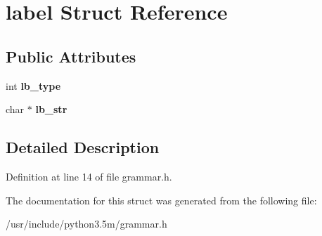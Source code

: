 \hypertarget{structlabel}{}\section{label Struct Reference}
\label{structlabel}
\subsection*{Public Attributes}
\begin{DoxyCompactItemize}
\item 
int {\bfseries lb\+\_\+type}\hypertarget{structlabel_a63a37c929ae2356ee04dbca24c7b9150}{}\label{structlabel_a63a37c929ae2356ee04dbca24c7b9150}

\item 
char $\ast$ {\bfseries lb\+\_\+str}\hypertarget{structlabel_a072175e15ad32047ab018fd71b8ab13e}{}\label{structlabel_a072175e15ad32047ab018fd71b8ab13e}

\end{DoxyCompactItemize}


\subsection{Detailed Description}


Definition at line 14 of file grammar.\+h.



The documentation for this struct was generated from the following file\+:\begin{DoxyCompactItemize}
\item 
/usr/include/python3.\+5m/grammar.\+h\end{DoxyCompactItemize}
